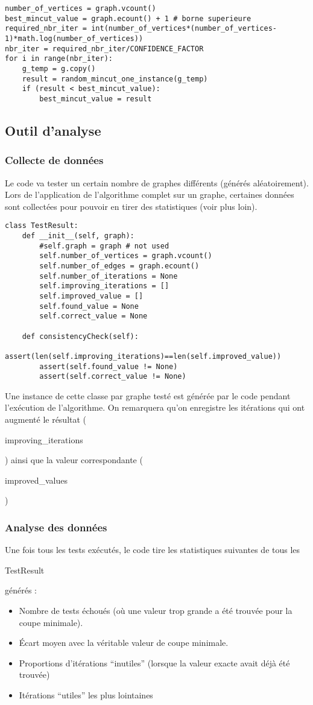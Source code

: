 \documentclass[a4paper,10pt]{article}
\begin{document}
\begin{lstlisting}
number_of_vertices = graph.vcount()
best_mincut_value = graph.ecount() + 1 # borne superieure
required_nbr_iter = int(number_of_vertices*(number_of_vertices-1)*math.log(number_of_vertices))
nbr_iter = required_nbr_iter/CONFIDENCE_FACTOR
for i in range(nbr_iter):
	g_temp = g.copy()
	result = random_mincut_one_instance(g_temp)
	if (result < best_mincut_value):
		best_mincut_value = result
\end{lstlisting}
\fontfamily{}

\subsection{Outil d'analyse}
\subsubsection{Collecte de données}
Le code va tester un certain nombre de graphes différents (générés aléatoirement). Lors de l'application de l'algorithme complet sur un graphe, certaines données sont collectées pour pouvoir en tirer des statistiques (voir plus loin).
\begin{lstlisting}
class TestResult:
	def __init__(self, graph):
		#self.graph = graph # not used
		self.number_of_vertices = graph.vcount()
		self.number_of_edges = graph.ecount()
		self.number_of_iterations = None
		self.improving_iterations = []
		self.improved_value = []
		self.found_value = None
		self.correct_value = None

	def consistencyCheck(self):
		assert(len(self.improving_iterations)==len(self.improved_value))
		assert(self.found_value != None)
		assert(self.correct_value != None)
\end{lstlisting}
\fontfamily{}
Une instance de cette classe par graphe testé est générée par le code pendant l'exécution de l'algorithme.
On remarquera qu'on enregistre les itérations qui ont augmenté le résultat
(\begin{it}improving\_iterations\end{it})
ainsi que la valeur correspondante
(\begin{it}improved\_values\end{it})

\subsubsection{Analyse des données}
Une fois tous les tests exécutés, le code tire les statistiques suivantes de tous les
\begin{it}TestResult\end{it}
générés :
\begin{itemize}
 \item Nombre de tests échoués (où une valeur trop grande a été trouvée pour la coupe minimale).
 \item Écart moyen avec la véritable valeur de coupe minimale.
 \item Proportions d'itérations ``inutiles'' (lorsque la valeur exacte avait déjà été trouvée)
 \item Itérations ``utiles'' les plus lointaines
\end{itemize}
\end{document}
